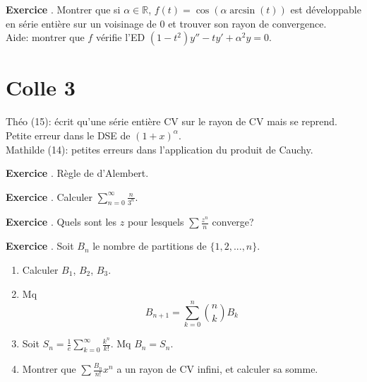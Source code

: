\documentclass[10pt,a4paper]{article}
\newcounter{question}
\newcounter{exo}
\newenvironment{exo}{\vspace{0.5cm}\setcounter{question}{0}\addtocounter{exo}{1} \noindent \textbf{Exercice \theexo}. \normalsize }{\par}
\begin{document}
	\begin{exo}
		Montrer que si $\alpha \in \mathbb{R}$, $f(t) =\cos(\alpha \arcsin(t))$ est développable en série entière sur un voisinage de 0 et trouver son rayon de convergence.\\
		Aide: montrer que $f$ vérifie l'ED $(1 - t^2) y'' - t y' + \alpha^2 y = 0$.
	\end{exo}
		
	\section*{Colle 3}
	\setcounter{exo}{0}
	Théo (15): écrit qu'une série entière CV sur le rayon de CV mais se reprend. Petite erreur dans le DSE de $(1+x)^\alpha$.\\
	Mathilde (14): petites erreurs dans l'application du produit de Cauchy.
	
	\begin{exo}
		Règle de d'Alembert.
	\end{exo}
	
	\begin{exo}
		Calculer $\sum_{n=0}^{\infty} \frac{n}{3^n}$.
	\end{exo}

	\begin{exo}
		Quels sont les $z$ pour lesquels $\sum \frac{z^n}{n}$ converge?
	\end{exo}

	\begin{exo}
		Soit $B_n$ le nombre de partitions de $\lbrace 1, 2, ..., n \rbrace$.
		\begin{enumerate}
			\item Calculer $B_1$, $B_2$, $B_3$.
			\item Mq $$B_{n+1} = \sum_{k=0}^{n} \binom{n}{k} B_k$$
			\item Soit $S_n = \frac{1}{e} \sum_{k=0}^{\infty} \frac{k^n}{k!}$. Mq $B_n = S_n$.
			\item Montrer que $\sum \frac{B_n}{n!} x^n$ a un rayon de CV infini, et calculer sa somme.
		\end{enumerate}
	\end{exo}
\end{document}

